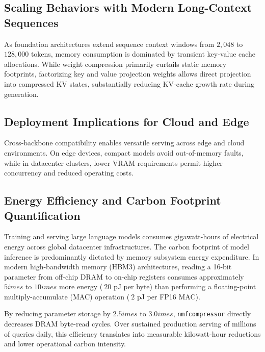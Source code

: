 \subsection{Scaling Behaviors with Modern Long-Context Sequences}
As foundation architectures extend sequence context windows from $2{,}048$ to $128{,}000$ tokens, memory consumption is dominated by transient key-value cache allocations. While weight compression primarily curtails static memory footprints, factorizing key and value projection weights allows direct projection into compressed KV states, substantially reducing KV-cache growth rate during generation.

\subsection{Deployment Implications for Cloud and Edge}
Cross-backbone compatibility enables versatile serving across edge and cloud environments. On edge devices, compact models avoid out-of-memory faults, while in datacenter clusters, lower VRAM requirements permit higher concurrency and reduced operating costs.

\subsection{Energy Efficiency and Carbon Footprint Quantification}
Training and serving large language models consumes gigawatt-hours of electrical energy across global datacenter infrastructures. The carbon footprint of model inference is predominantly dictated by memory subsystem energy expenditure. In modern high-bandwidth memory (HBM3) architectures, reading a 16-bit parameter from off-chip DRAM to on-chip registers consumes approximately $5	imes$ to $10	imes$ more energy ($~20$ pJ per byte) than performing a floating-point multiply-accumulate (MAC) operation ($~2$ pJ per FP16 MAC).

By reducing parameter storage by $2.5	imes$ to $3.0	imes$, \texttt{nmfcompressor} directly decreases DRAM byte-read cycles. Over sustained production serving of millions of queries daily, this efficiency translates into measurable kilowatt-hour reductions and lower operational carbon intensity.

